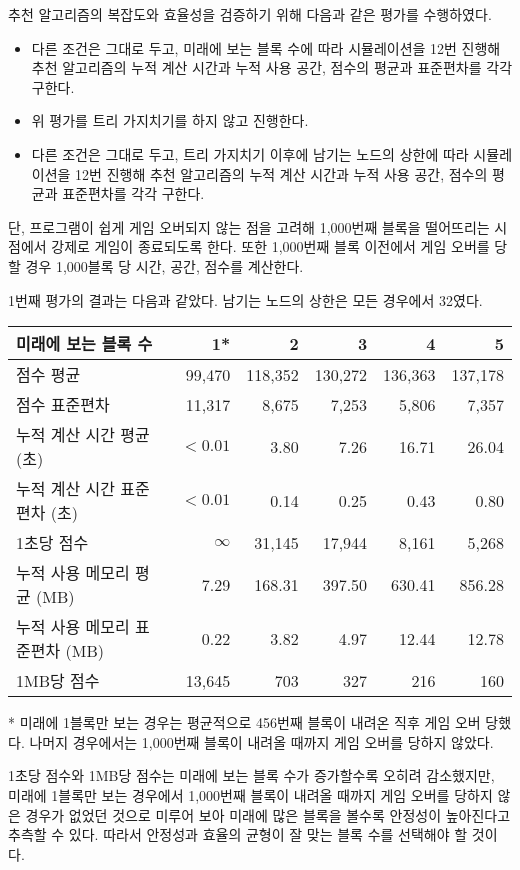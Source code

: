 추천 알고리즘의 복잡도와 효율성을 검증하기 위해 다음과 같은 평가를 수행하였다.
\begin{itemize}
    \item 다른 조건은 그대로 두고, 미래에 보는 블록 수에 따라 시뮬레이션을 12번 진행해
    추천 알고리즘의 누적 계산 시간과 누적 사용 공간, 점수의
    평균과 표준편차를 각각 구한다.
    \item 위 평가를 트리 가지치기를 하지 않고 진행한다.
    \item 다른 조건은 그대로 두고, 트리 가지치기 이후에 남기는 노드의 상한에 따라
    시뮬레이션을 12번 진행해 추천 알고리즘의 누적 계산 시간과 누적 사용 공간, 점수의
    평균과 표준편차를 각각 구한다.
\end{itemize}
단, 프로그램이 쉽게 게임 오버되지 않는 점을 고려해 1,000번째 블록을 떨어뜨리는 시점에서
강제로 게임이 종료되도록 한다. 또한 1,000번째 블록 이전에서 게임 오버를 당할 경우
1,000블록 당 시간, 공간, 점수를 계산한다.

1번째 평가의 결과는 다음과 같았다. 남기는 노드의 상한은 모든 경우에서 32였다.
\begin{center}
    \begin{tabular}{l|r|r|r|r|r}
        미래에 보는 블록 수 & 1* & 2 & 3 & 4 & 5 \\
        \hline
        점수 평균 & 99,470 & 118,352 & 130,272 & 136,363 & 137,178 \\
        점수 표준편차 & 11,317 & 8,675 & 7,253 & 5,806 & 7,357 \\
        \hline
        누적 계산 시간 평균 (초) & $<0.01$ & 3.80 & 7.26 & 16.71 & 26.04 \\
        누적 계산 시간 표준편차 (초) & $<0.01$ & 0.14 & 0.25 & 0.43 & 0.80 \\
        1초당 점수 & $\infty$ & 31,145 & 17,944 & 8,161 & 5,268 \\
        \hline
        누적 사용 메모리 평균 (MB) & 7.29 & 168.31 & 397.50 & 630.41 & 856.28 \\
        누적 사용 메모리 표준편차 (MB) & 0.22 & 3.82 & 4.97 & 12.44 & 12.78 \\
        1MB당 점수 & 13,645 & 703 & 327 & 216 & 160 \\
    \end{tabular}
\end{center}
* 미래에 1블록만 보는 경우는 평균적으로 456번째 블록이 내려온 직후 게임 오버 당했다.
나머지 경우에서는 1,000번째 블록이 내려올 때까지 게임 오버를 당하지 않았다.

1초당 점수와 1MB당 점수는 미래에 보는 블록 수가 증가할수록 오히려 감소했지만,
미래에 1블록만 보는 경우에서 1,000번째 블록이 내려올 때까지 게임 오버를 당하지 않은
경우가 없었던 것으로 미루어 보아 미래에 많은 블록을 볼수록 안정성이 높아진다고
추측할 수 있다. 따라서 안정성과 효율의 균형이 잘 맞는 블록 수를 선택해야 할 것이다.

